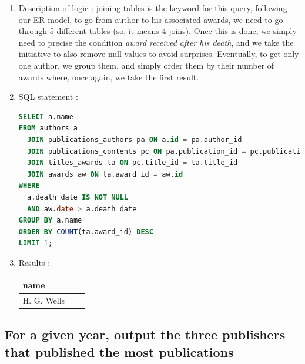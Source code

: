 \documentclass[doubleside, titlepage]{article}
\begin{document}
			\begin{enumerate}
	\item Description of logic : joining tables is the keyword for this query, following our ER model, to go from author to his associated awards, we need to go through 5 different tables (so, it means 4 joins). Once this is done, we simply need to precise the condition \textit{award received after his death}, and we take the initiative to also remove null values to avoid surprises. Eventually, to get only one author, we group them, and simply order them by their number of awards where, once again, we take the first result.
	\item SQL statement :
		\begin{lstlisting}[language=SQL,showspaces=false,basicstyle=\ttfamily,numberstyle=\tiny,commentstyle=\color{gray}]
SELECT a.name
FROM authors a
  JOIN publications_authors pa ON a.id = pa.author_id
  JOIN publications_contents pc ON pa.publication_id = pc.publication_id
  JOIN titles_awards ta ON pc.title_id = ta.title_id
  JOIN awards aw ON ta.award_id = aw.id
WHERE
  a.death_date IS NOT NULL
  AND aw.date > a.death_date
GROUP BY a.name
ORDER BY COUNT(ta.award_id) DESC
LIMIT 1;
		\end{lstlisting}

	\item Results :\\

	\begin{tabular}{|l|c|r|}
  \hline
  name \\
  \hline
H. G. Wells\\
  \hline
\end{tabular}

	\end{enumerate}

\subsection{For a given year, output the three publishers that published the most publications}
\end{document}
